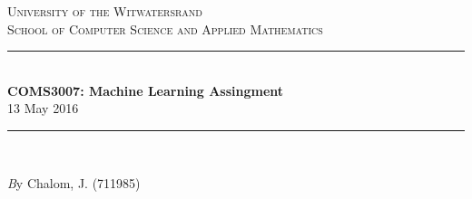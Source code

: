 \documentclass[11pt]{article}
\begin{document}
\begin{page}

\newcommand{\HRule}{\rule{\linewidth}{0.3mm}} %
\renewcommand\section{\@startsection{section}{1}{\z@}%
                                  {-3.5ex \@plus -1ex \@minus -.2ex}%
                                  {2.3ex \@plus.2ex}%
                                  {\normalfont\large\bfseries}}
\setlength{\parindent}{0pt}

\center %
 

\textsc{\LARGE University of the Witwatersrand}\\[1.5cm] %
\textsc{\Large School of Computer Science and Applied Mathematics}\\[0.5cm] %


\HRule \\[0.4cm]
{ \huge \bfseries COMS3007: Machine Learning Assingment}\\[0.4cm] %
  \large 13 May 2016
\HRule \\[1.5cm]
 
\begin{minipage}{1\textwidth}
	\Large \emph By Chalom, J. (711985)\\
\end{minipage}


\vfill %

\end{page}
\end{document}

